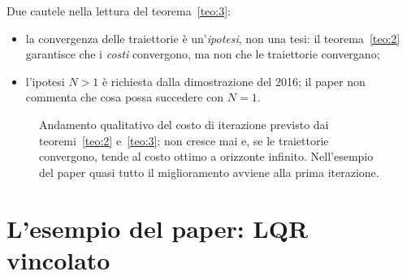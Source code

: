 \documentclass[11pt,a4paper]{article}
\theoremstyle{definition}
\theoremstyle{plain}
\theoremstyle{remark}
\newcommand{\Jstar}{J^{*}_{0\to\infty}}
\begin{document}
Due cautele nella lettura del teorema~\ref{teo:3}:
\begin{itemize}
  \item la convergenza delle traiettorie è un'\emph{ipotesi}, non una tesi: il
        teorema~\ref{teo:2} garantisce che i \emph{costi} convergono, ma non che
        le traiettorie convergano;
  \item l'ipotesi $N>1$ è richiesta dalla dimostrazione del 2016; il paper non
        commenta che cosa possa succedere con $N=1$.
\end{itemize}

\begin{figure}[h]
\centering
{}
\caption{Andamento qualitativo del costo di iterazione previsto dai
teoremi~\ref{teo:2} e~\ref{teo:3}: non cresce mai e, se le traiettorie
convergono, tende al costo ottimo a orizzonte infinito. Nell'esempio del paper
quasi tutto il miglioramento avviene alla prima iterazione.}
\label{fig:costo-iterazioni}
\end{figure}

\section{L'esempio del paper: LQR vincolato}\label{sec:esempio}
\end{document}
